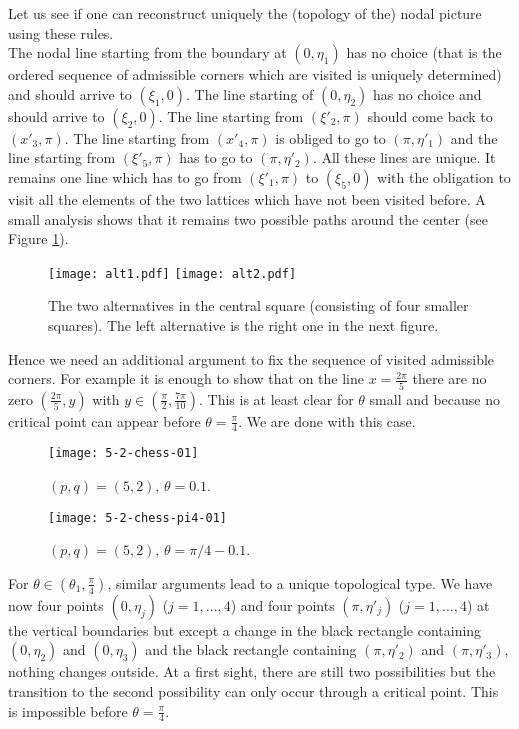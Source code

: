 \documentclass[a4paper,reqno,11pt]{amsart}
\theoremstyle{remark}
\theoremstyle{definition}
\numberwithin{equation}{section}
\begin{document}
Let us see if one can reconstruct uniquely  the  (topology of the) nodal picture using these 
rules.\\
The nodal line starting from the boundary at  $(0,\eta_1)$ has no choice  
(that is the ordered sequence of admissible corners which are visited 
 is uniquely determined) and should arrive to $(\xi_1,0)$. 
The line starting of $(0,\eta_2)$ has no choice and should arrive to
 $(\xi_2,0)$. The line starting from $(\xi'_2,\pi)$ should come back 
to $(x'_3,\pi)$. The line starting from $(x'_4,\pi)$ is obliged to go to
$(\pi,\eta'_1)$ and the line starting from $(\xi'_5,\pi)$ has to go to $(\pi,\eta'_2)$. 
All these lines are unique. It remains one line which has to go from 
$(\xi'_1,\pi)$ to $(\xi_5,0)$ with the obligation to visit all the elements of the 
two lattices which have not been visited before. A small analysis shows that 
it remains two possible paths around the center (see Figure \ref{fig:5-2alt}). 
  
 
\begin{figure}[htbp]
\centering
\texttt{[image: alt1.pdf]}  
\hskip 2cm 
\texttt{[image: alt2.pdf]}
\caption{The two alternatives in the central square (consisting of four smaller 
squares). The left alternative is the right one in  the next figure.}
\label{fig:5-2alt}
\end{figure}
Hence we need an additional argument to fix the sequence of visited 
admissible corners.
For example it is enough to show that on the line $x= \frac{2\pi}{5}$ there are 
no zero  $(\frac{2\pi}{5},y)$ with $y \in (\frac \pi 2, \frac{7 \pi}{10})$. 
This is at least clear for $\theta$ small and because no critical point can 
appear before $\theta =\frac \pi 4$. We are done with this case.

\begin{figure}[ht]
\centering
\texttt{[image: 5-2-chess-01]}
\caption{$(p,q)= (5,2)$, $\theta=0.1$.}
\label{fig:5-2-chess-01}
\end{figure}

\begin{figure}[ht]
\centering
\texttt{[image: 5-2-chess-pi4-01]}
\caption{$(p,q)= (5,2)$, $\theta=\pi/4-0.1$.}
\label{fig:5-2-chess-pi4-01}
\end{figure}

For $\theta \in (\theta_1,\frac \pi 4)$, similar arguments lead to a unique 
topological  type.  We have now four points $(0, \eta_j)$ ($j=1,\dots,4$) and four points $(\pi,\eta'_j)$ ($j=1,\dots,4$) at the vertical boundaries
 but except a change in the black rectangle containing  $(0,\eta_2)$ and $(0,\eta_3)$ and the black rectangle containing $(\pi,\eta'_2)$ and $(\pi,\eta'_3)$, nothing changes outside.  At a first sight, there are still two possibilities but the 
transition to the second possibility can only occur through a critical point. 
This is impossible before $\theta=\frac \pi 4$.
\end{document}
